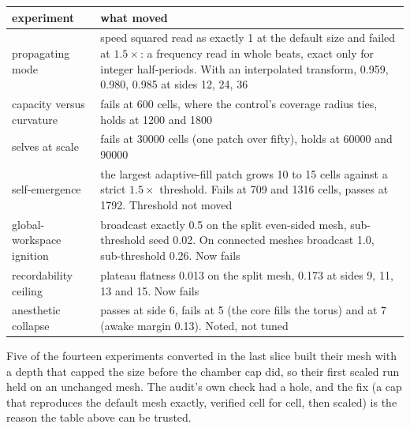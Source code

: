\begin{center}
\begin{tabular}{@{}lp{9.6cm}@{}}
\toprule
experiment & what moved \\
\midrule
propagating mode & speed squared read as exactly 1 at the default size and failed at $1.5\times$: a frequency read in whole beats, exact only for integer half-periods. With an interpolated transform, 0.959, 0.980, 0.985 at sides 12, 24, 36 \\
capacity versus curvature & fails at 600 cells, where the control's coverage radius ties, holds at 1200 and 1800 \\
selves at scale & fails at 30000 cells (one patch over fifty), holds at 60000 and 90000 \\
self-emergence & the largest adaptive-fill patch grows 10 to 15 cells against a strict $1.5\times$ threshold. Fails at 709 and 1316 cells, passes at 1792. Threshold not moved \\
global-workspace ignition & broadcast exactly 0.5 on the split even-sided mesh, sub-threshold seed 0.02. On connected meshes broadcast 1.0, sub-threshold 0.26. Now fails \\
recordability ceiling & plateau flatness 0.013 on the split mesh, 0.173 at sides 9, 11, 13 and 15. Now fails \\
anesthetic collapse & passes at side 6, fails at 5 (the core fills the torus) and at 7 (awake margin 0.13). Noted, not tuned \\
\bottomrule
\end{tabular}
\end{center}

Five of the fourteen experiments converted in the last slice built their mesh with a depth that capped the size
before the chamber cap did, so their first scaled run held on an unchanged mesh. The audit's own check had a hole,
and the fix (a cap that reproduces the default mesh exactly, verified cell for cell, then scaled) is the reason the
table above can be trusted.
